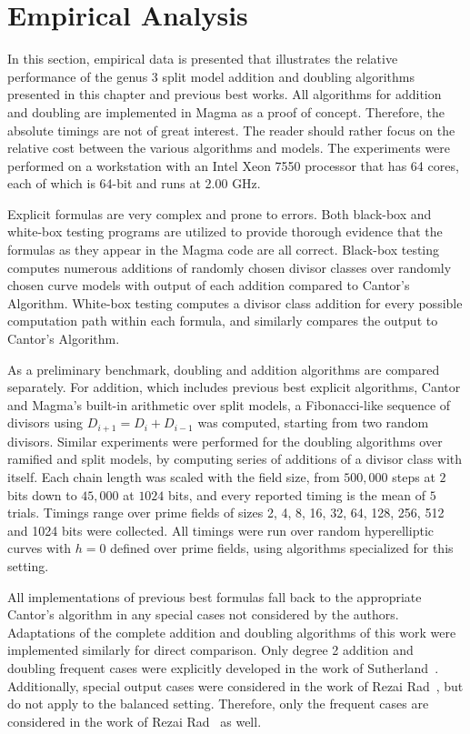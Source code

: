 \section{Empirical Analysis}
\label{sec:g3numerical}

In this section, empirical data is presented that illustrates the relative
performance of the genus 3 split model addition and doubling algorithms
presented in this chapter and previous best works. All algorithms for addition
and doubling are implemented in Magma as a proof of concept. Therefore, the
absolute timings are not of great interest. The reader should rather focus on
the relative cost between the various algorithms and models. The experiments
were performed on a workstation with an Intel Xeon 7550 processor that has 64
cores, each of which is 64-bit and runs at 2.00 GHz. 

Explicit formulas are very complex and prone to errors. Both black-box
and white-box testing programs are utilized to provide thorough evidence that
the formulas as they appear in the Magma code are all correct. Black-box testing
computes numerous additions of randomly chosen divisor classes over randomly
chosen curve models with output of each addition compared to Cantor's Algorithm.
White-box testing computes a divisor class addition for every possible
computation path within each formula, and similarly compares the output to
Cantor's Algorithm. 

As a preliminary benchmark, doubling and addition algorithms are compared
separately. For addition, which includes previous best explicit algorithms,
Cantor and Magma's built-in arithmetic over split models, a
Fibonacci-like sequence of divisors using $D_{i+1} = D_{i} + D_{i-1}$ was
computed, starting from two random divisors. Similar experiments were performed
for the doubling algorithms over ramified and split models, by computing series
of additions of a divisor class with itself. Each chain length was scaled with
the field size, from $500{,}000$ steps at $2$ bits down to $45{,}000$ at $1024$
bits, and every reported timing is the mean of $5$ trials. Timings range over
prime fields of sizes 2, 4, 8, 16, 32, 64, 128, 256, 512 and 1024 bits were
collected. All timings were run over random hyperelliptic curves with $h=0$
defined over prime fields, using algorithms specialized for this setting.

All implementations of previous best formulas fall back to the appropriate
Cantor's algorithm in any special cases not considered by the authors. Adaptations
of the complete addition and doubling algorithms of this work were implemented
similarly for direct comparison. Only degree 2 addition and doubling frequent
cases were explicitly developed in the work of
Sutherland~\cite{Sutherland_g3_2019}. Additionally, special output cases were
considered in the work of Rezai Rad~\cite{rad2019jacobian}, but do not apply to the
balanced setting. Therefore, only the frequent cases are considered in the work
of Rezai Rad~\cite{rad2019jacobian} as well.

